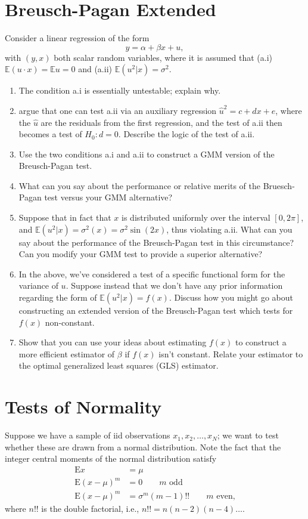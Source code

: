 \documentclass[12pt]{amsart}
\renewcommand{\E}{\ensuremath{\mathds{E}}}
\begin{document}
\section{Breusch-Pagan Extended}
\label{sec:orgb6be17c}
Consider a linear regression of the form
\begin{equation}
   y = \alpha + \beta x + u,
\end{equation}
with \((y,x)\) both scalar random variables, where it is assumed that
(a.i) \(\E(u\cdot x) = \E u = 0\) and (a.ii) \(\E(u^2|x)=\sigma^2\).
\begin{enumerate}
\item The condition a.i is essentially untestable; explain why.
\item \textcite{breusch-pagan79} argue that one can test a.ii via an
auxiliary regression \(\hat{u}^2 = c + d x + e\), where the \(\hat{u}\)
are the residuals from the first regression, and the test of a.ii
then becomes a test of \(H_0:d=0\).   Describe the logic of
the test of a.ii.
\item Use the two conditions a.i and a.ii to construct a GMM version of
the Breusch-Pagan test.
\item What can you say  about the performance or relative merits of the
Bruesch-Pagan test versus your GMM alternative?
\item Suppose that in fact that \(x\) is distributed uniformly over the
interval \([0,2\pi]\), and \(\E(u^2|x)=\sigma^2(x)=\sigma^2\sin(2x)\), thus
violating a.ii.  What can you say about the performance of the
Breusch-Pagan test in this circumstance?  Can you modify your GMM
test to provide a superior alternative?
\item In the above, we've considered a test of a specific functional
form for the variance of \(u\).  Suppose instead that we don't have
any prior information regarding the form of \(\E(u^2|x)=f(x)\).
Discuss how you might go about constructing an extended version
of the Breusch-Pagan test which tests for \(f(x)\) non-constant.
\item Show that you can use your ideas about estimating \(f(x)\) to
construct a more efficient estimator of \(\beta\) if \(f(x)\) isn't
constant.  Relate your estimator to the optimal generalized least
squares (GLS) estimator.
\end{enumerate}

\section{Tests of Normality}
\label{sec:org7798f32}
Suppose we have a sample of iid observations \(x_1,x_2,\dots,x_N\); we
want to test whether these are drawn from a normal distribution.
Note the fact that the integer central moments of the normal
distribution satisfy
\begin{align*}
 \mbox{E} x &= \mu\\
 \mbox{E}(x-\mu)^m &= 0\qquad\text{$m$ odd}\\
 \mbox{E}(x-\mu)^m &= \sigma^m(m-1)!!\qquad\text{$m$ even,}
\end{align*}
where \(n!!\) is the double factorial, i.e., \(n!!=n(n-2)(n-4)\dots\).
\end{document}
